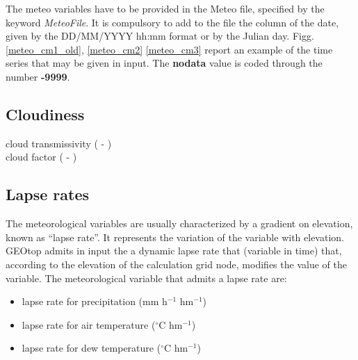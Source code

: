 \noindent The meteo variables have to be provided in the Meteo file, specified by the keyword {\it MeteoFile}. 
 It is compulsory to add to the file the column of the date, given by the DD/MM/YYYY hh:mm format or by the Julian day.
 Figg. \ref{meteo_cm1_old}, \ref{meteo_cm2} \ref{meteo_cm3} report an example of the time series that may be given in input.
The {\bf nodata} value is coded through the number {\bf -9999}.

\subsection{Cloudiness}

cloud transmissivity ( - )\\
cloud factor ( - ) 

\subsection{Lapse rates}

The meteorological variables are usually characterized by a gradient on elevation, known as ``lapse rate''. It represents the variation of the variable with elevation. GEOtop admits in input the a dynamic lapse rate that (variable in time) that, according to the elevation of the calculation grid node, modifies the value of the variable. The meteorological variable that admits a lapse rate are:
\begin{itemize}
\item lapse rate for precipitation (mm h$^{-1}$ hm$^{-1}$)\\
\item lapse rate for air temperature ($^\circ$C hm$^{-1}$)\\
\item lapse rate for dew temperature ($^\circ$C hm$^{-1}$)
\end{itemize}


